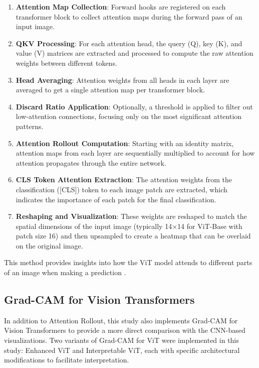 \documentclass[a4paper,12pt]{report}
\begin{document}
\begin{enumerate}
    \item \textbf{Attention Map Collection}: Forward hooks are registered on each transformer block to collect attention maps during the forward pass of an input image.
    
    \item \textbf{QKV Processing}: For each attention head, the query (Q), key (K), and value (V) matrices are extracted and processed to compute the raw attention weights between different tokens.
    
    \item \textbf{Head Averaging}: Attention weights from all heads in each layer are averaged to get a single attention map per transformer block.
    
    \item \textbf{Discard Ratio Application}: Optionally, a threshold is applied to filter out low-attention connections, focusing only on the most significant attention patterns.
    
    \item \textbf{Attention Rollout Computation}: Starting with an identity matrix, attention maps from each layer are sequentially multiplied to account for how attention propagates through the entire network.
    
    \item \textbf{CLS Token Attention Extraction}: The attention weights from the classification ([CLS]) token to each image patch are extracted, which indicates the importance of each patch for the final classification.
    
    \item \textbf{Reshaping and Visualization}: These weights are reshaped to match the spatial dimensions of the input image (typically 14×14 for ViT-Base with patch size 16) and then upsampled to create a heatmap that can be overlaid on the original image.
\end{enumerate}

This method provides insights into how the ViT model attends to different parts of an image when making a prediction \citep{chefer2021generic}.

\subsection{Grad-CAM for Vision Transformers}

In addition to Attention Rollout, this study also implements Grad-CAM for Vision Transformers to provide a more direct comparison with the CNN-based visualizations. Two variants of Grad-CAM for ViT were implemented in this study: Enhanced ViT and Interpretable ViT, each with specific architectural modifications to facilitate interpretation.
\end{document}
